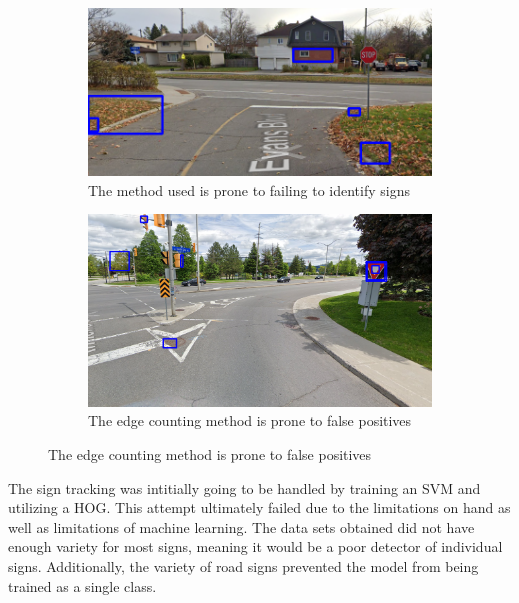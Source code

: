 \begin{figure}[H]
    \begin{subfigure}[b]{.49\textwidth}
      \centering
      \label{stop Sign}
      \includegraphics[width=\textwidth]{figures/stoptest.png}
      \caption{The method used is prone to failing to identify signs}
    \end{subfigure}
    \begin{subfigure}[b]{.49\textwidth}
      \includegraphics[width=\textwidth]{figures/yieldTest.png}
      \caption{The edge counting method is prone to false positives}
    \end{subfigure}
\end{figure}

The sign tracking was intitially going to be handled by training an SVM and utilizing a HOG.
This attempt ultimately failed due to the limitations on hand as well as limitations of machine learning.
The data sets obtained did not have enough variety for most signs, meaning it would be a poor detector of individual signs.
Additionally, the variety of road signs prevented the model from being trained as a single class.

